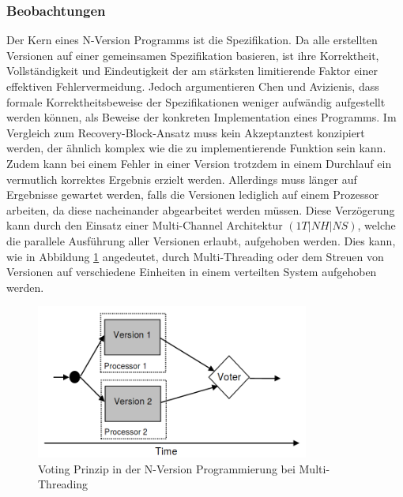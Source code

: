 \subsubsection{Beobachtungen}
Der Kern eines N-Version Programms ist die Spezifikation.
Da alle erstellten Versionen auf einer gemeinsamen Spezifikation basieren, ist ihre Korrektheit, Vollständigkeit und Eindeutigkeit der am stärksten limitierende Faktor einer effektiven Fehlervermeidung.
Jedoch argumentieren Chen und Avizienis, dass formale Korrektheitsbeweise der Spezifikationen weniger aufwändig aufgestellt werden können, als Beweise der konkreten Implementation eines Programms.
Im Vergleich zum Recovery-Block-Ansatz muss kein Akzeptanztest konzipiert werden, der ähnlich komplex wie die zu implementierende Funktion sein kann. Zudem kann bei einem Fehler in einer Version trotzdem in einem Durchlauf ein vermutlich korrektes Ergebnis erzielt werden. Allerdings muss länger auf Ergebnisse gewartet werden, falls die Versionen lediglich auf einem Prozessor arbeiten, da diese nacheinander abgearbeitet werden müssen. Diese Verzögerung kann durch den Einsatz einer Multi-Channel Architektur $(1T|NH|NS)$, welche die parallele Ausführung aller Versionen erlaubt, aufgehoben werden. Dies kann, wie in Abbildung \ref{graph-n-version-multi} angedeutet, durch  Multi-Threading oder dem Streuen von Versionen auf verschiedene Einheiten in einem verteilten System aufgehoben werden. 
%
\begin{figure}[ht]
	\centering
	\includegraphics[width=0.8\textwidth,natwidth=901,natheight=333]{grafiken/multi-thread-n-version.png}
	\caption{Voting Prinzip in der N-Version Programmierung bei Multi-Threading \cite{lucent}}
	\label{graph-n-version-multi}
\end{figure}
%
